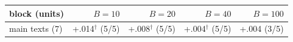 \begin{tabular}{@{}lrrrr@{}}
\toprule
block (units) & $B=10$ & $B=20$ & $B=40$ & $B=100$ \\
\midrule
main texts (7) & +.014$^{\dagger}$ (5/5) & +.008$^{\dagger}$ (5/5) & +.004$^{\dagger}$ (5/5) & +.004 (3/5) \\
\bottomrule
\end{tabular}
